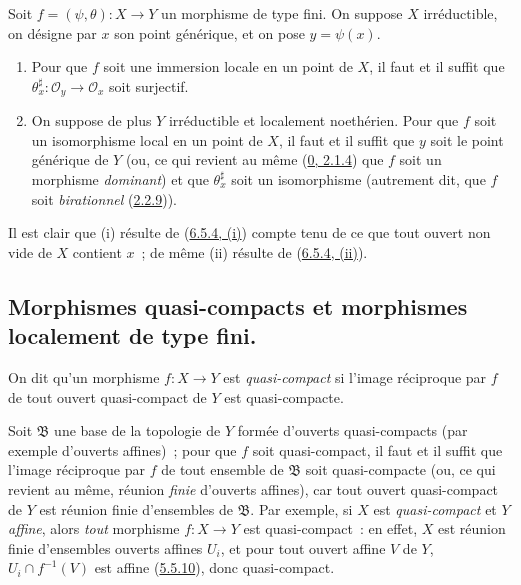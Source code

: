 \begin{corollary}[6.5.5]
\label{I.6.5.5-fr}
Soit $f=(\psi,\theta):X\to Y$ un morphisme de type fini. On suppose $X$
irréductible, on désigne par $x$ son point générique, et on pose $y=\psi(x)$.
\begin{enumerate}
  \item[(i)] Pour que $f$ soit une immersion locale en un point de $X$, il
    faut et il suffit que
    $\theta_x^\sharp:\mathscr{O}_y\to\mathscr{O}_x$ soit surjectif.
  \item[(ii)] On suppose de plus $Y$ irréductible et localement noethérien.
    Pour que $f$ soit un isomorphisme local en un point de $X$, il faut et il
    suffit que $y$ soit le point générique de $Y$ (ou, ce qui revient au même
    (\hyperref[0.2.1.4-fr]{0, 2.1.4}) que $f$ soit un morphisme
    \emph{dominant}) et que $\theta_x^\sharp$ soit un isomorphisme (autrement
    dit, que $f$ soit \emph{birationnel}
    (\hyperref[I.2.2.9-fr]{2.2.9})).
\end{enumerate}
\end{corollary}

Il est clair que (i) résulte de
(\hyperref[I.6.5.4-fr]{6.5.4, (i)}) compte tenu de ce que tout ouvert non vide
de $X$ contient $x$~; de même (ii) résulte de
(\hyperref[I.6.5.4-fr]{6.5.4, (ii)}).

\subsection{Morphismes quasi-compacts et morphismes localement de type fini.}
\label{subsection:I.6.6-fr}

\begin{definition}[6.6.1]
\label{I.6.6.1-fr}
On dit qu'un morphisme $f:X\to Y$ est \emph{quasi-compact} si l'image
réciproque par $f$ de tout ouvert quasi-compact de $Y$ est quasi-compacte.
\end{definition}

Soit $\mathfrak{B}$ une base de la topologie de $Y$ formée d'ouverts
quasi-compacts (par exemple d'ouverts affines)~; pour que $f$ soit
quasi-compact, il faut et il suffit que l'image réciproque par $f$ de tout
ensemble de $\mathfrak{B}$ soit quasi-compacte (ou, ce qui revient au même,
réunion \emph{finie} d'ouverts affines), car tout ouvert quasi-compact de $Y$
est réunion finie d'ensembles de $\mathfrak{B}$. Par exemple, si $X$ est
\emph{quasi-compact} et $Y$ \emph{affine}, alors \emph{tout} morphisme
$f:X\to Y$ est quasi-compact~: en effet, $X$ est réunion finie d'ensembles
ouverts affines $U_i$, et pour tout ouvert affine $V$ de $Y$,
$U_i\cap f^{-1}(V)$ est affine
(\hyperref[I.5.5.10-fr]{5.5.10}), donc quasi-compact.

